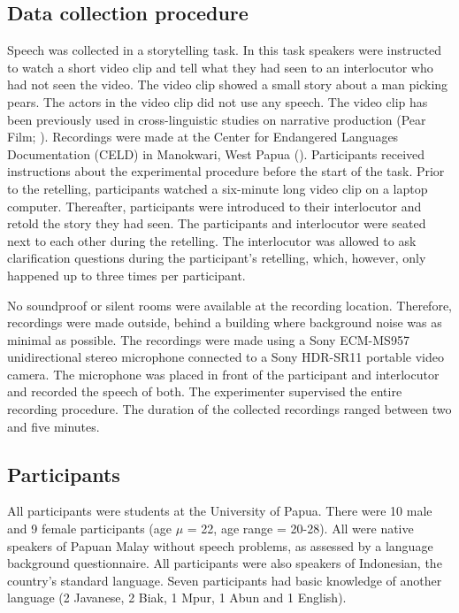 \subsection{Data collection procedure}
Speech was collected in a storytelling task. In this task speakers were instructed to watch a short video clip and tell what they had seen to an interlocutor who had not seen the video. The video clip showed a small story about a man picking pears. The actors in the video clip did not use any speech. The video clip has been previously used in cross-linguistic studies on narrative production (Pear Film; \citealt{chafe_pear_1980}). Recordings were made at the Center for Endangered Languages Documentation (CELD) in Manokwari, West Papua (\citealt{riesberg_dobes_2012}). Participants received instructions about the experimental procedure before the start of the task. Prior to the retelling, participants watched a six-minute long video clip on a laptop computer. Thereafter, participants were introduced to their interlocutor and retold the story they had seen. The participants and interlocutor were seated next to each other during the retelling. The interlocutor was allowed to ask clarification questions during the participant's retelling, which, however, only happened up to three times per participant.\par 

No soundproof or silent rooms were available at the recording location. Therefore, recordings were made outside, behind a building where background noise was as minimal as possible. The recordings were made using a Sony ECM-MS957 unidirectional stereo microphone connected to a Sony HDR-SR11 portable video camera. The microphone was placed in front of the participant and interlocutor and recorded the speech of both. The experimenter supervised the entire recording procedure. The duration of the collected recordings ranged between two and five minutes.

\subsection{Participants}
All participants were students at the University of Papua. There were 10 male and 9 female participants (age $\mu$ = 22, age range = 20-28). All were native speakers of Papuan Malay without speech problems, as assessed by a language background questionnaire. All participants were also speakers of Indonesian, the country's standard language. Seven participants had basic knowledge of another language (2 Javanese, 2 Biak, 1 Mpur, 1 Abun and 1 English).

